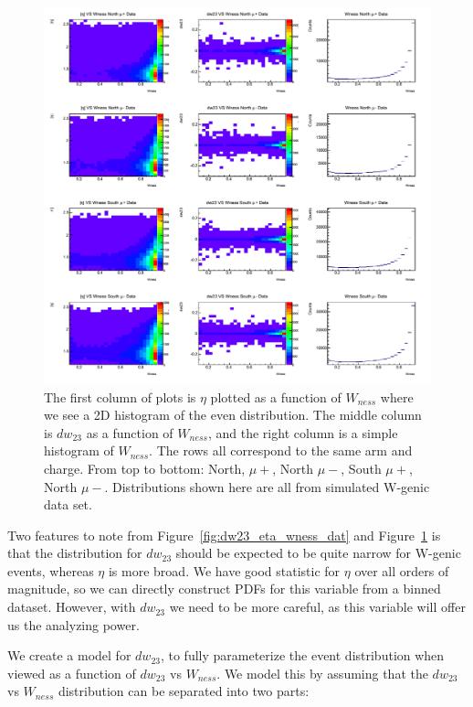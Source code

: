 \begin{figure}
  \centering
  \includegraphics[width=\linewidth]{./figures/dw23_vs_wness_simulation.png}
  \caption{
    The first column of plots is $\eta$ plotted as a function of $W_{ness}$
    where we see a 2D histogram of the even distribution. The middle column is
    $dw_{23}$ as a function of $W_{ness}$, and the right column is a simple
    histogram of $W_{ness}$. The rows all correspond to the same arm and charge.
    From top to bottom: North, $\mu+$, North $\mu-$, South $\mu+$, North $\mu-$.
    Distributions shown here are all from simulated W-genic data set.
  }
  \label{fig:dw23_eta_wness_sim}
\end{figure}

Two features to note from Figure~\ref{fig:dw23_eta_wness_dat} and
Figure~\ref{fig:dw23_eta_wness_sim} is that the distribution for $dw_{23}$
should be expected to be quite narrow for W-genic events, whereas $\eta$ is more
broad. We have good statistic for $\eta$ over all orders of magnitude, so we can
directly construct PDFs for this variable from a binned dataset. However, with
$dw_{23}$ we need to be more careful, as this variable will offer us the
analyzing power.

We create a model for $dw_{23}$, to fully parameterize the event distribution
when viewed as a function of $dw_{23}$ vs $W_{ness}$. We model this by assuming
that the $dw_{23}$ vs $W_{ness}$ distribution can be separated into two parts:


